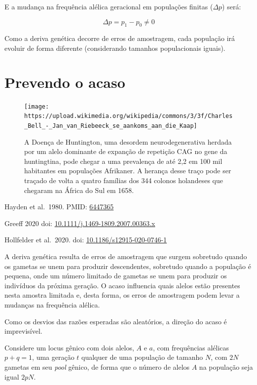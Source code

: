 \documentclass[
]{book}
\begin{document}
E a mudança na frequência alélica geracional em populações finitas (\(\Delta p\)) será:

\[\Delta p = p_1 - p_0 \ne 0\]

Como a deriva genética decorre de erros de amostragem, cada população irá evoluir de forma diferente (considerando tamanhos populacionais iguais).

\hypertarget{prevendo-o-acaso}{%
\section{Prevendo o acaso}\label{prevendo-o-acaso}}

\begin{figure}

{\centering \texttt{[image: https://upload.wikimedia.org/wikipedia/commons/3/3f/Charles\_Bell\_-\_Jan\_van\_Riebeeck\_se\_aankoms\_aan\_die\_Kaap]} 

}

\caption{A Doença de Huntington, uma desordem neurodegenerativa herdada por um alelo dominante de expanção de repetição CAG no gene da huntingtina, pode chegar a uma prevalença de até 2,2 em 100 mil habitantes em populações Afrikaner. A herança desse traço pode ser traçado de volta a quatro famílias dos 344 colonos holandeses que chegaram na África do Sul em 1658.}\label{fig:hungtington}
\end{figure}

Hayden et al.~1980. PMID: \href{https://pubmed.ncbi.nlm.nih.gov/6447365/}{6447365}

Greeff 2020 doi: \href{https://doi.org/10.1111/j.1469-1809.2007.00363.x}{10.1111/j.1469-1809.2007.00363.x}

Hollfelder et al.~2020. doi: \href{https://doi.org/10.1186/s12915-020-0746-1}{10.1186/s12915-020-0746-1}

A deriva genética resulta de erros de amostragem que surgem sobretudo quando os gametas se unem para produzir descendentes, sobretudo quando a população é pequena, onde um número limitado de gametas se unem para produzir os indivíduos da próxima geração. O acaso influencia quais alelos estão presentes nesta amostra limitada e, desta forma, os erros de amostragem podem levar a mudanças na frequência alélica.

Como os desvios das razões esperadas são aleatórios, a direção do acaso é imprevisível.

Considere um locus gênico com dois alelos, \(A\) e \(a\), com frequências alélicas \(p+q=1\), uma geração \(t\) qualquer de uma população de tamanho \(N\), com \(2N\) gametas em seu \emph{pool} gênico, de forma que o número de alelos \(A\) na população seja igual \(2pN\).
\end{document}
